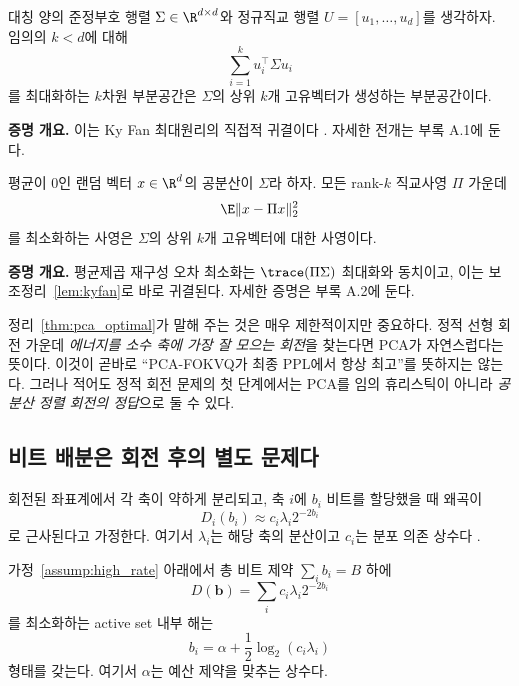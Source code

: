 \begin{lemma}
\label{lem:kyfan}
대칭 양의 준정부호 행렬 $\Sigma \in \R^{d \times d}$와 정규직교 행렬 $U=[u_1,\dots,u_d]$를 생각하자. 임의의 $k<d$에 대해
\[
\sum_{i=1}^{k} u_i^\top \Sigma u_i
\]
를 최대화하는 $k$차원 부분공간은 $\Sigma$의 상위 $k$개 고유벡터가 생성하는 부분공간이다.
\end{lemma}

\begin{theorycomment}
\textbf{증명 개요.} 이는 Ky Fan 최대원리의 직접적 귀결이다 \citep{horn2012matrix}. 자세한 전개는 부록 A.1에 둔다.
\end{theorycomment}

\begin{theorem}
\label{thm:pca_optimal}
평균이 0인 랜덤 벡터 $x \in \R^d$의 공분산이 $\Sigma$라 하자. 모든 rank-$k$ 직교사영 $\Pi$ 가운데
\[
\E\lVert x-\Pi x\rVert_2^2
\]
를 최소화하는 사영은 $\Sigma$의 상위 $k$개 고유벡터에 대한 사영이다.
\end{theorem}

\begin{theorycomment}
\textbf{증명 개요.} 평균제곱 재구성 오차 최소화는 $\trace(\Pi\Sigma)$ 최대화와 동치이고, 이는 보조정리~\ref{lem:kyfan}로 바로 귀결된다. 자세한 증명은 부록 A.2에 둔다.
\end{theorycomment}

정리~\ref{thm:pca_optimal}가 말해 주는 것은 매우 제한적이지만 중요하다. 정적 선형 회전 가운데 \emph{에너지를 소수 축에 가장 잘 모으는 회전}을 찾는다면 PCA가 자연스럽다는 뜻이다. 이것이 곧바로 ``PCA-FOKVQ가 최종 PPL에서 항상 최고''를 뜻하지는 않는다. 그러나 적어도 정적 회전 문제의 첫 단계에서는 PCA를 임의 휴리스틱이 아니라 \emph{공분산 정렬 회전의 정답}으로 둘 수 있다.

\subsection{비트 배분은 회전 후의 별도 문제다}

\begin{assumption}[고율 축별 왜곡 근사]
\label{assump:high_rate}
회전된 좌표계에서 각 축이 약하게 분리되고, 축 $i$에 $b_i$ 비트를 할당했을 때 왜곡이
\[
D_i(b_i)\approx c_i \lambda_i 2^{-2b_i}
\]
로 근사된다고 가정한다. 여기서 $\lambda_i$는 해당 축의 분산이고 $c_i$는 분포 의존 상수다 \citep{cover2006elements}.
\end{assumption}

\begin{lemma}
\label{lem:waterfilling}
가정~\ref{assump:high_rate} 아래에서 총 비트 제약 $\sum_i b_i=B$ 하에
\[
D(\mathbf{b})=\sum_i c_i\lambda_i 2^{-2b_i}
\]
를 최소화하는 active set 내부 해는
\[
b_i=\alpha+\frac{1}{2}\log_2(c_i\lambda_i)
\]
형태를 갖는다. 여기서 $\alpha$는 예산 제약을 맞추는 상수다.
\end{lemma}

